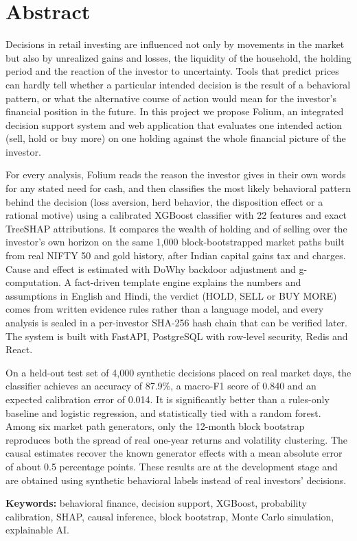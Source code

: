 \chapter*{Abstract}
Decisions in retail investing are influenced not only by movements in the market but also by unrealized gains and losses, the liquidity of the household, the holding period and the reaction of the investor to uncertainty. Tools that predict prices can hardly tell whether a particular intended decision is the result of a behavioral pattern, or what the alternative course of action would mean for the investor's financial position in the future. In this project we propose Folium, an integrated decision support system and web application that evaluates one intended action (sell, hold or buy more) on one holding against the whole financial picture of the investor.

For every analysis, Folium reads the reason the investor gives in their own words for any stated need for cash, and then classifies the most likely behavioral pattern behind the decision (loss aversion, herd behavior, the disposition effect or a rational motive) using a calibrated XGBoost classifier with 22 features and exact TreeSHAP attributions. It compares the wealth of holding and of selling over the investor's own horizon on the same 1,000 block-bootstrapped market paths built from real NIFTY 50 and gold history, after Indian capital gains tax and charges. Cause and effect is estimated with DoWhy backdoor adjustment and g-computation. A fact-driven template engine explains the numbers and assumptions in English and Hindi, the verdict (HOLD, SELL or BUY MORE) comes from written evidence rules rather than a language model, and every analysis is sealed in a per-investor SHA-256 hash chain that can be verified later. The system is built with FastAPI, PostgreSQL with row-level security, Redis and React.

On a held-out test set of 4,000 synthetic decisions placed on real market days, the classifier achieves an accuracy of 87.9\%, a macro-F1 score of 0.840 and an expected calibration error of 0.014. It is significantly better than a rules-only baseline and logistic regression, and statistically tied with a random forest. Among six market path generators, only the 12-month block bootstrap reproduces both the spread of real one-year returns and volatility clustering. The causal estimates recover the known generator effects with a mean absolute error of about 0.5 percentage points. These results are at the development stage and are obtained using synthetic behavioral labels instead of real investors' decisions.

\textbf{Keywords:} behavioral finance, decision support, XGBoost, probability calibration, SHAP, causal inference, block bootstrap, Monte Carlo simulation, explainable AI.

